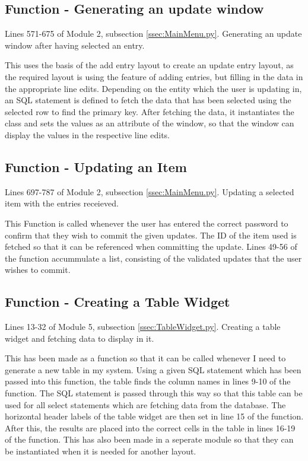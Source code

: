 \subsection{Function - Generating an update window}
Lines 571-675 of Module 2, subsection \ref{ssec:MainMenu.py}. Generating an update window after having selected an entry.
\begin{tiny}
\end{tiny}
This uses the basis of the add entry layout to create an update entry layout, as the required layout is using the feature of adding entries, but filling in the data in the appropriate line edits. Depending on the entity which the user is updating in, an SQL statement is defined to fetch the data that has been selected using the selected row to find the primary key. After fetching the data, it instantiates the class and sets the values as an attribute of the window, so that the window can display the values in the respective line edits.

\subsection{Function - Updating an Item}
Lines 697-787 of Module 2, subsection \ref{ssec:MainMenu.py}. Updating a selected item with the entries receieved.
\begin{tiny}
\end{tiny}
This Function is called whenever the user has entered the correct password to confirm that they wish to commit the given updates. The ID of the item used is fetched so that it can be referenced when committing the update. Lines 49-56 of the function accummulate a list, consisting of the validated updates that the user wishes to commit.

\subsection{Function - Creating a Table Widget}
Lines 13-32 of Module 5, subsection \ref{ssec:TableWidget.py}. Creating a table widget and fetching data to display in it.
\begin{tiny}
\end{tiny}
This has been made as a function so that it can be called whenever I need to generate a new table in my system. Using a given SQL statement which has been passed into this function, the table finds the column names in lines 9-10 of the function. The SQL statement is passed through this way so that this table can be used for all select statements which are fetching data from the database. The horizontal header labels of the table widget are then set in line 15 of the function. After this, the results are placed into the correct cells in the table in lines 16-19 of the function. This has also been made in a seperate module so that they can be instantiated when it is needed for another layout.

